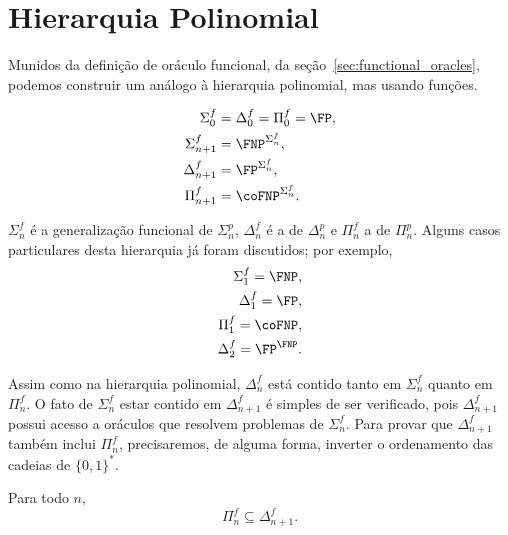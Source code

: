 \section{Hierarquia Polinomial}

Munidos da definição de oráculo funcional,
da seção~\ref{sec:functional_oracles},
podemos construir um análogo à hierarquia polinomial,
mas usando funções.

\begin{definition}
    \begin{align*}
        \Sigma_0^f &= \Delta_0^f = \Pi_0^f = \FP, \\
        \Sigma_{n+1}^f &= \FNP^{\Sigma_n^f}, \\
        \Delta_{n+1}^f &= \FP^{\Sigma_n^f}, \\
        \Pi_{n+1}^f &= \coFNP^{\Sigma_n^f}.
    \end{align*}
\end{definition}

$\Sigma_n^f$ é a generalização funcional de $\Sigma_n^p$,
$\Delta_n^f$ é a de $\Delta_n^p$
e $\Pi_n^f$ a de $\Pi_n^p$.
Alguns casos particulares desta hierarquia já foram discutidos;
por exemplo,
\begin{align*}
    \Sigma_1^f = \FNP, \\
    \Delta_1^f = \FP, \\
    \Pi_1^f = \coFNP, \\
    \Delta_2^f = \FP^\FNP.
\end{align*}

Assim como na hierarquia polinomial,
$\Delta_n^f$ está contido tanto em $\Sigma_n^f$ quanto em $\Pi_n^f$.
O fato de $\Sigma_n^f$ estar contido em $\Delta_{n+1}^f$
é simples de ser verificado,
pois $\Delta_{n+1}^f$ possui acesso a oráculos
que resolvem problemas de $\Sigma_n^f$.
Para provar que $\Delta_{n+1}^f$ também inclui $\Pi_n^f$,
precisaremos, de alguma forma,
inverter o ordenamento das cadeias de $\{0, 1\}^*$.

\begin{proposition}
    Para todo $n$,
    \begin{equation*}
        \Pi_n^f \subseteq \Delta_{n+1}^f.
    \end{equation*}
    \label{thm:pi_f_subseteq_delta_f}
\end{proposition}

